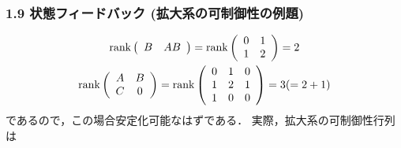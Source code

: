 \begin{frame}[t]
\frametitle{1.9 状態フィードバック (拡大系の可制御性の例題)}
\vspace*{-5mm}

\begin{gather}
 \mathop{\rm rank}\nolimits
 \left(
 \begin{array}{cc}
  B & AB
 \end{array}
 \right) =
 \mathop{\rm rank}\nolimits
 \left(
 \begin{array}{cc}
  0 & 1 \\
  1 & 2
 \end{array}
 \right) = 2 \\
 \mathop{\rm rank}\nolimits
 \left(
 \begin{array}{cc}
  A & B \\
  C & 0
 \end{array}
 \right) =
 \mathop{\rm rank}\nolimits
 \left(
 \begin{array}{ccc}
  0 & 1 & 0 \\
  1 & 2 & 1 \\
  1 & 0 & 0
 \end{array}
 \right) =
 3(= 2 + 1)
\end{gather}
であるので，この場合安定化可能なはずである．
実際，拡大系の可制御性行列は


\end{frame}
